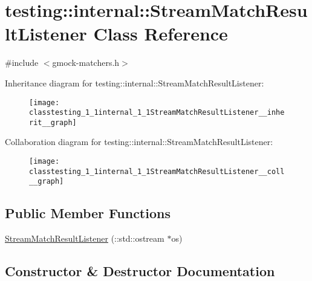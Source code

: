 \hypertarget{classtesting_1_1internal_1_1StreamMatchResultListener}{}\section{testing\+:\+:internal\+:\+:Stream\+Match\+Result\+Listener Class Reference}
\label{classtesting_1_1internal_1_1StreamMatchResultListener}


{\ttfamily \#include $<$gmock-\/matchers.\+h$>$}



Inheritance diagram for testing\+:\+:internal\+:\+:Stream\+Match\+Result\+Listener\+:
\nopagebreak
\begin{figure}[H]
\begin{center}
\leavevmode
\texttt{[image: classtesting\_1\_1internal\_1\_1StreamMatchResultListener\_\_inherit\_\_graph]}
\end{center}
\end{figure}


Collaboration diagram for testing\+:\+:internal\+:\+:Stream\+Match\+Result\+Listener\+:
\nopagebreak
\begin{figure}[H]
\begin{center}
\leavevmode
\texttt{[image: classtesting\_1\_1internal\_1\_1StreamMatchResultListener\_\_coll\_\_graph]}
\end{center}
\end{figure}
\subsection*{Public Member Functions}
\begin{DoxyCompactItemize}
\item 
\hyperlink{classtesting_1_1internal_1_1StreamMatchResultListener_a81985760741d818745237df002d65d04}{Stream\+Match\+Result\+Listener} (\+::std\+::ostream $\ast$os)
\end{DoxyCompactItemize}


\subsection{Constructor \& Destructor Documentation}
